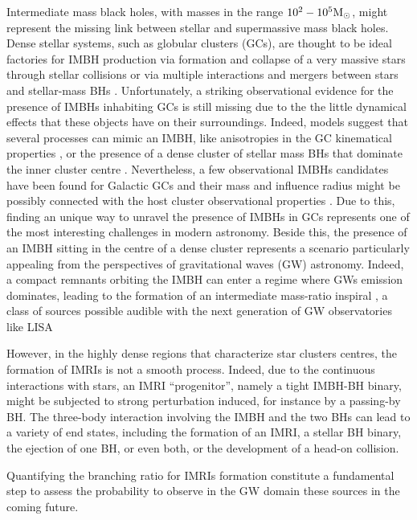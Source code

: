 \documentclass[twocolumn]{aastex62}
\newcommand{\Ms}{{\rm M}_\odot}
\begin{document}
Intermediate mass black holes, with masses in the range $10^2-10^5\Ms$, might represent the missing link between stellar and supermassive mass black holes. Dense stellar systems, such as globular clusters (GCs), are thought to be ideal factories for IMBH production via formation and collapse of a very massive stars through stellar collisions \citep{zwart02, giersz15, mapelli16} or via multiple interactions and mergers between stars and stellar-mass BHs \citep{giersz15}. Unfortunately, a striking observational evidence for the presence of IMBHs inhabiting GCs is still missing due to the the little dynamical effects that these objects have on their surroundings. Indeed, models suggest that several processes can mimic an IMBH, like anisotropies in the GC kinematical properties \citep{zocchi}, or the presence of a dense cluster of stellar mass BHs that dominate the inner cluster centre \citep{AAG18a,AAG18b,AS16,vandermarel10}. Nevertheless, a few observational IMBHs candidates have been found for Galactic GCs \citep{noyola10,lu13,lanzoni13,kiziltan17} and their mass and influence radius might be possibly connected with the host cluster observational properties \citep{AAG18a}. Due to this, finding an unique way to unravel the presence of IMBHs in GCs represents one of the most interesting challenges in modern astronomy. Beside this, the presence of an IMBH sitting in the centre of a dense cluster represents a scenario particularly appealing from the perspectives of gravitational waves (GW) astronomy. Indeed, a compact remnants orbiting the IMBH can enter a regime where GWs emission dominates, leading to the formation of an intermediate mass-ratio inspiral \citep[IMRI,][]{konstantinidis13,haster16,leigh14}, a class of sources possible audible with the next generation of GW observatories like LISA \citep{seoane07,amaro12,seoane18}

However, in the highly dense regions that characterize star clusters centres, the formation of IMRIs is not a smooth process. Indeed, due to the continuous interactions with stars, an IMRI ``progenitor'', namely a tight IMBH-BH binary, might be subjected to strong perturbation induced, for instance by a passing-by BH. The three-body interaction involving the IMBH and the two BHs can lead to a variety of end states, including the formation of an IMRI, a stellar BH binary, the ejection of one BH, or even both, or the development of a head-on collision. 

Quantifying the branching ratio for IMRIs formation constitute a fundamental step to assess the probability to observe in the GW domain these sources in the coming future. 
\end{document}
